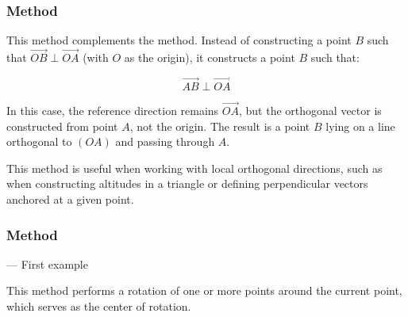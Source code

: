 
\subsubsection{Method } %
\label{ssub:_point_at_method}

This method complements the  method. Instead of constructing a point $B$ such that $\overrightarrow{OB} \perp \overrightarrow{OA}$ (with $O$ as the origin), it constructs a point $B$ such that:

\[
\overrightarrow{AB} \perp \overrightarrow{OA}
\]

\noindent
In this case, the reference direction remains $\overrightarrow{OA}$, but the orthogonal vector is constructed from point $A$, not the origin. The result is a point $B$ lying on a line orthogonal to $(OA)$ and passing through $A$.

\medskip
\noindent
This method is useful when working with local orthogonal directions, such as when constructing altitudes in a triangle or defining perpendicular vectors anchored at a given point.

\vspace{1em}


\begin{tkzexample}[latex=7cm]
 \begin{center}
 \end{center}
\end{tkzexample}


\subsubsection{Method } — First example %
\label{ssub:example_rotation_of_points}

This method performs a rotation of one or more points around the current point, which serves as the center of rotation.

